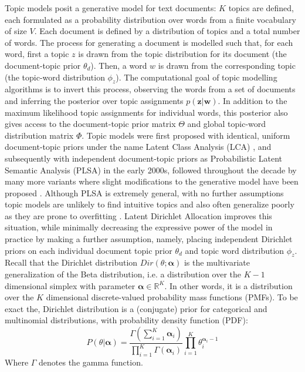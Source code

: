 Topic models posit a generative model for text documents: $K$ topics are defined, each formulated as a probability distribution over words from a finite vocabulary of size $V$. Each document is defined by a distribution of topics and a total number of words. The process for generating a document is modelled such that, for each word, first a topic $z$ is drawn from the topic distribution for its document (the document-topic prior $\theta_d$). Then, a word $w$ is drawn from the corresponding topic (the topic-word distribution $\phi_{z}$). The computational goal of topic modelling algorithms is to invert this process, observing the words from a set of documents and inferring the posterior over topic assignments $p(\boldsymbol{z} | \boldsymbol{w})$. In addition to the maximum likelihood topic assignments for individual words, this posterior also gives access to the document-topic prior matrix $\Theta$ and global topic-word distribution matrix $\Phi$. Topic models were first proposed with identical, uniform document-topic priors under the name Latent Class Analysis (LCA) \citep{Hofmann2000}, and subsequently with independent document-topic priors as Probabilistic Latent Semantic Analysis (PLSA) \citep{Hofmann2001} in the early 2000s, followed throughout the decade by many more variants where slight modifications to the generative model have been proposed \citep{Blei2010}.
Although PLSA is extremely general, with no further assumptions topic models are unlikely to find intuitive topics and also often generalize poorly as they are prone to overfitting \citep{Blei2003}.
Latent Dirichlet Allocation improves this situation, while minimally decreasing the expressive power of the model in practice by making a further assumption, namely, placing independent Dirichlet priors on each individual document topic prior $\theta_d$ and topic word distribution $\phi_z$.
Recall that the Dirichlet distribution $Dir(\theta; \boldsymbol{\alpha})$ is the multivariate generalization of the Beta distribution, i.e. a distribution over the $K-1$ dimensional simplex with parameter $\boldsymbol{\alpha} \in \mathbb{R}^K$. In other words, it is a distribution over the $K$ dimensional discrete-valued probability mass functions (PMFs). To be exact the, Dirichlet distribution is a (conjugate) prior for categorical and multinomial distributions, with probability density function (PDF):
\begin{equation}
P(\theta|\boldsymbol{\alpha}) = \frac{\Gamma(\sum_{i=1}^{K} \boldsymbol{\alpha}_i)}{\prod_{i=1}^{K} \Gamma(\boldsymbol{\alpha}_i)} \prod_{i=1}^{K} \theta_i^{\boldsymbol{\alpha}_i -1}
\end{equation}
Where $\Gamma$ denotes the gamma function.

